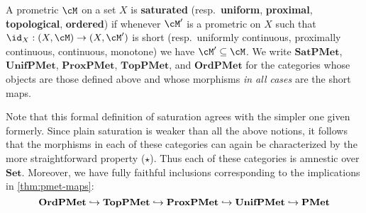 \documentclass{article}
\def\R{\mathbb{R}}
\def\Re{\overline{\R}}
\def\Set{\mathbf{Set}}
\def\PMet{\mathbf{PMet}}
\def\TopPMet{\mathbf{TopPMet}}
\def\UnifPMet{\mathbf{UnifPMet}}
\def\ProxPMet{\mathbf{ProxPMet}}
\def\OrdPMet{\mathbf{OrdPMet}}
\def\SatPMet{\mathbf{SatPMet}}
\begin{document}
\begin{defn}
  A prometric $\cM$ on a set $X$ is \textbf{saturated} (resp.\ \textbf{uniform}, \textbf{proximal}, \textbf{topological}, \textbf{ordered}) if whenever $\cM'$ is a prometric on $X$ such that $\id_X:(X,\cM) \to (X,\cM')$ is short (resp.\ uniformly continuous, proximally continuous, continuous, monotone) we have $\cM'\subseteq \cM$.
  We write $\SatPMet$, $\UnifPMet$, $\ProxPMet$, $\TopPMet$, and $\OrdPMet$ for the categories whose objects are those defined above and whose morphisms \emph{in all cases} are the short maps.
\end{defn}

Note that this formal definition of saturation agrees with the simpler one given formerly.
Since plain saturation is weaker than all the above notions, it follows that the morphisms in each of these categories can again be characterized by the more straightforward property ($\star$).
Thus each of these categories is amnestic over $\Set$.
Moreover, we have fully faithful inclusions corresponding to the implications in \cref{thm:pmet-maps}:
\[ \OrdPMet \into \TopPMet \into \ProxPMet \into \UnifPMet \into \PMet \]
\end{document}
